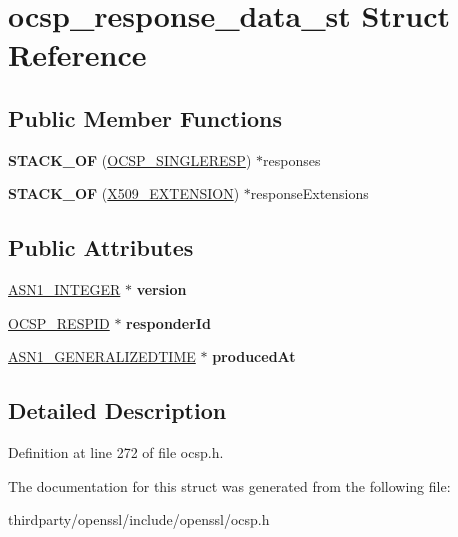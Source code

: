 \hypertarget{structocsp__response__data__st}{}\section{ocsp\+\_\+response\+\_\+data\+\_\+st Struct Reference}
\label{structocsp__response__data__st}
\subsection*{Public Member Functions}
\begin{DoxyCompactItemize}
\item 
\mbox{\label{structocsp__response__data__st_a56d73019256af5660a2e0f539f9a9daf}} 
{\bfseries S\+T\+A\+C\+K\+\_\+\+OF} (\hyperlink{structocsp__single__response__st}{O\+C\+S\+P\+\_\+\+S\+I\+N\+G\+L\+E\+R\+E\+SP}) $\ast$responses
\item 
\mbox{\label{structocsp__response__data__st_a84a88c2a6975ca68c843b886f0a96ded}} 
{\bfseries S\+T\+A\+C\+K\+\_\+\+OF} (\hyperlink{struct_x509__extension__st}{X509\+\_\+\+E\+X\+T\+E\+N\+S\+I\+ON}) $\ast$response\+Extensions
\end{DoxyCompactItemize}
\subsection*{Public Attributes}
\begin{DoxyCompactItemize}
\item 
\mbox{\label{structocsp__response__data__st_ab8d2433650a7535a807f54c97aa03e94}} 
\hyperlink{structasn1__string__st}{A\+S\+N1\+\_\+\+I\+N\+T\+E\+G\+ER} $\ast$ {\bfseries version}
\item 
\mbox{\label{structocsp__response__data__st_ad3f3152513fd758f44cec6d8b1d78375}} 
\hyperlink{structocsp__responder__id__st}{O\+C\+S\+P\+\_\+\+R\+E\+S\+P\+ID} $\ast$ {\bfseries responder\+Id}
\item 
\mbox{\label{structocsp__response__data__st_a70d47981b37a14ee1dabb1b8dd170e0d}} 
\hyperlink{structasn1__string__st}{A\+S\+N1\+\_\+\+G\+E\+N\+E\+R\+A\+L\+I\+Z\+E\+D\+T\+I\+ME} $\ast$ {\bfseries produced\+At}
\end{DoxyCompactItemize}


\subsection{Detailed Description}


Definition at line 272 of file ocsp.\+h.



The documentation for this struct was generated from the following file\+:\begin{DoxyCompactItemize}
\item 
thirdparty/openssl/include/openssl/ocsp.\+h\end{DoxyCompactItemize}
